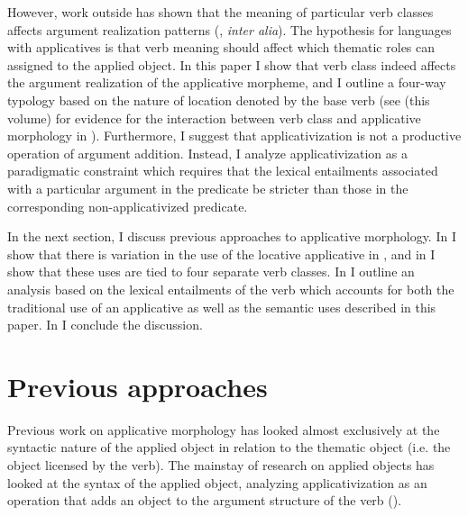 \documentclass[output=paper]{langsci/langscibook}
\begin{document}
 However, work outside  has shown that the meaning of particular verb classes affects argument realization patterns (\citealt{fillmore:1970,levin:1993,lrh:2008a,beavers:2011a}, \emph{inter alia}). The hypothesis for languages with applicatives is that verb meaning should affect which thematic roles can assigned to the applied object. In this paper I show that verb class indeed affects the argument realization of the applicative morpheme, and I outline a four-way typology based on the nature of location denoted by the base verb (see \citealt{sibanda:2016} (this volume) for evidence for the interaction between verb class and applicative morphology in ). Furthermore, I suggest that applicativization is not a productive operation of argument addition. Instead, I analyze applicativization as a paradigmatic constraint which requires that the lexical entailments associated with a particular argument in the predicate be stricter than those in the corresponding non-applicativized predicate.
 
 
In the next section, I discuss previous approaches to applicative morphology. In  I show that there is variation in the use of the locative applicative in , and in  I show that these uses are tied to four separate verb classes. In  I outline an analysis based on the lexical entailments of the verb which accounts for both the traditional use of an applicative as well as the semantic uses described in this paper. In  I conclude the discussion.
	 
 

\section{Previous approaches}\label{sec:jerro:2} %
 

 Previous work on applicative morphology has looked almost exclusively at the syntactic nature of the applied object in relation to the thematic object (i.e. the object licensed by the verb). The mainstay of research on applied objects has looked at the syntax of the applied object, analyzing applicativization as an operation that adds an object to the argument structure of the verb (\citealt{baker:1988,bresnan:1990,alsina:1992,AlsinaMchombo1993,marantz:1993,pylkkanen:2008, mcginnis:2001,mcginnis:2003,baker:2006,zeller:2006,zellerngoboka:2006,peterson:2007, jeong:2007,bakeretal:2012,jerro:2015}).  
  
\end{document}
